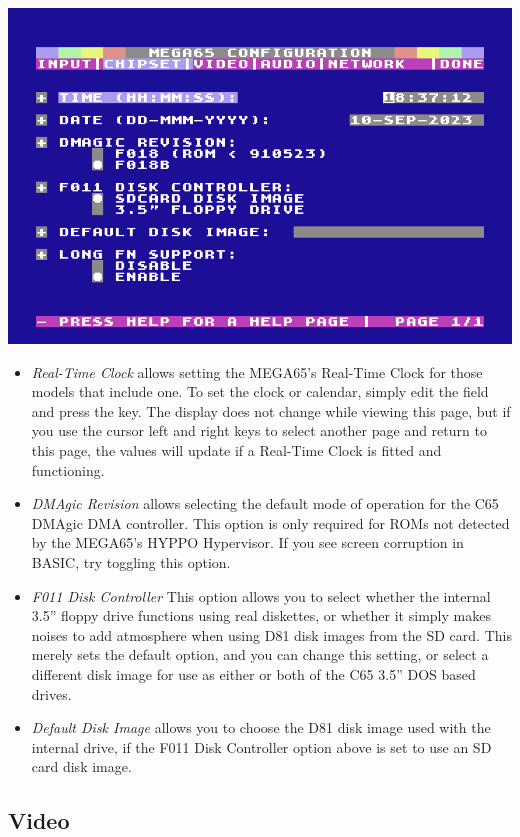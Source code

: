 \includegraphics[width=\linewidth]{images/ss-m65config-2.png}

\begin{itemize}
  \item{\em Real-Time Clock} allows setting the MEGA65's Real-Time
    Clock for those models that include one.  To set the clock or
    calendar, simply edit the field and press the 
    key.  The display does not change while viewing this page, but if
    you use the cursor left and right keys to select another page and
    return to this page, the values will update if a Real-Time Clock
    is fitted and functioning.
  \item{\em DMAgic Revision} allows selecting the default mode of
    operation for the C65 DMAgic DMA controller.  This option is only
    required for ROMs not detected by the MEGA65's HYPPO Hypervisor.
    If you see screen corruption in BASIC,
    try toggling this option.
  \item{\em F011 Disk Controller}
    This option allows you to select whether the internal 3.5'' floppy
    drive functions using real diskettes, or whether it simply makes
    noises to add atmosphere when using D81 disk images from the SD
    card.  This merely sets the default option, and you can change
    this setting, or select a different disk image for use as either
    or both of the C65 3.5'' DOS based drives.
  \item{\em Default Disk Image} allows you to choose the D81 disk image
    used with the internal drive, if the F011 Disk
    Controller option above is set to use an SD card disk image.
\end{itemize}

\subsection{Video}

